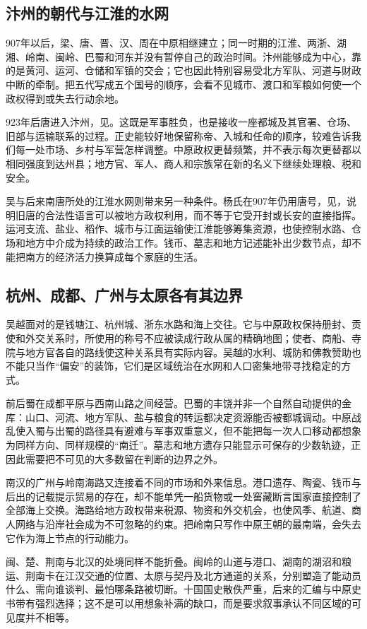 \subsection{汴州的朝代与江淮的水网}
907年以后，梁、唐、晋、汉、周在中原相继建立；同一时期的江淮、两浙、湖湘、岭南、闽岭、巴蜀和河东并没有暂停自己的政治时间。汴州能够成为中心，靠的是黄河、运河、仓储和军镇的交会；它也因此特别容易受北方军队、河道与财政中断的牵制。把五代写成五个国号的顺序，会看不见城市、渡口和军粮如何使一个政权得到或失去行动余地。

923年后唐进入汴州，见。这既是军事胜负，也是接收一座都城及其官署、仓场、旧部与运输联系的过程。正史能较好地保留称帝、入城和任命的顺序，较难告诉我们每一处市场、乡村与军营怎样调整。中原政权更替频繁，并不表示每次更替都以相同强度到达州县；地方官、军人、商人和宗族常在新的名义下继续处理粮、税和安全。

吴与后来南唐所处的江淮水网则带来另一种条件。杨氏在907年仍用唐号，见，说明旧唐的合法性语言可以被地方政权利用，而不等于它受开封或长安的直接指挥。运河支流、盐业、稻作、城市与江面运输使江淮能够筹集资源，也使控制水路、仓场和地方中介成为持续的政治工作。钱币、墓志和地方记述能补出少数节点，却不能把南方的经济活力换算成每个家庭的生活。

\subsection{杭州、成都、广州与太原各有其边界}
吴越面对的是钱塘江、杭州城、浙东水路和海上交往。它与中原政权保持册封、贡使和外交关系时，所使用的称号不应被读成行政从属的精确地图；使者、商船、寺院与地方官各自的路线使这种关系具有实际内容。吴越的水利、城防和佛教赞助也不能只当作“偏安”的装饰，它们是区域统治在水网和人口密集地带寻找稳定的方式。

前后蜀在成都平原与西南山路之间经营。巴蜀的丰饶并非一个自然自动提供的金库：山口、河流、地方军队、盐与粮食的转运都决定资源能否被都城调动。中原战乱使入蜀与出蜀的路径具有避难与军事双重意义，但不能把每一次人口移动都想象为同样方向、同样规模的“南迁”。墓志和地方遗存只能显示可保存的少数轨迹，正因此需要把不可见的大多数留在判断的边界之外。

南汉的广州与岭南海路又连接着不同的市场和外来信息。港口遗存、陶瓷、钱币与后出的记载提示贸易的存在，却不能单凭一船货物或一处窖藏断言国家直接控制了全部海上交换。海路给地方政权带来税源、物资和外交机会，也使风季、航道、商人网络与沿岸社会成为不可忽略的约束。把岭南只写作中原王朝的最南端，会失去它作为海上节点的行动能力。

闽、楚、荆南与北汉的处境同样不能折叠。闽岭的山道与港口、湖南的湖沼和粮运、荆南卡在江汉交通的位置、太原与契丹及北方通道的关系，分别塑造了能动员什么、需向谁谈判、最怕哪条路被切断。十国国史散佚严重，后来的汇编与中原史书带有强烈选择；这不是可以用想象补满的缺口，而是要求叙事承认不同区域的可见度并不相等。

